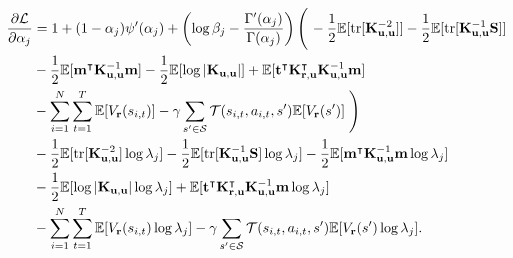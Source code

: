 \documentclass{article}
\theoremstyle{definition}
\DeclareMathOperator{\tr}{tr}
\newcommand{\Kuu}{\mathbf{K}_{\mathbf{u},\mathbf{u}}}
\newcommand{\Kru}{\mathbf{K}_{\mathbf{r},\mathbf{u}}}
\begin{document}
\[
  \begin{split}
    \frac{\partial\mathcal{L}}{\partial\alpha_j} &= 1 + (1 -
    \alpha_j)\psi'(\alpha_j) + \left( \log\beta_j -
      \frac{\Gamma'(\alpha_j)}{\Gamma(\alpha_j)} \right)
    \left(\vphantom{\sum_{i=1}^N} \right. - \frac{1}{2}
    \mathbb{E}[\tr[\Kuu^{-2}]] - \frac{1}{2}\mathbb{E}[\tr[\Kuu^{-1}\mathbf{S}]]
    \\
    &- \frac{1}{2}\mathbb{E}[\mathbf{m}^\intercal\Kuu^{-1}\mathbf{m}] -
    \frac{1}{2}\mathbb{E}[\log|\Kuu|] +
    \mathbb{E}[\mathbf{t}^\intercal\Kru^\intercal\Kuu^{-1}\mathbf{m}] \\
    &- \sum_{i=1}^N \sum_{t=1}^T \mathbb{E}[V_{\mathbf{r}}(s_{i,t})] - \gamma\sum_{s' \in
      \mathcal{S}} \mathcal{T}(s_{i,t}, a_{i,t}, s')\mathbb{E}[V_{\mathbf{r}}(s')] \left.
      \vphantom{\sum_{i=1}^N} \right) \\
    & - \frac{1}{2}\mathbb{E}[\tr[\Kuu^{-2}]\log\lambda_j] -
    \frac{1}{2}\mathbb{E}[\tr[\Kuu^{-1}\mathbf{S}]\log\lambda_j] -
    \frac{1}{2}\mathbb{E}[\mathbf{m}^\intercal\Kuu^{-1}\mathbf{m}\log\lambda_j]
    \\
    &- \frac{1}{2}\mathbb{E}[\log|\Kuu|\log\lambda_j] +
    \mathbb{E}[\mathbf{t}^\intercal\Kru^\intercal\Kuu^{-1}\mathbf{m}\log\lambda_j]
    \\
    &- \sum_{i=1}^N\sum_{t=1}^T\mathbb{E}[V_{\mathbf{r}}(s_{i,t})\log\lambda_j] -
    \gamma\sum_{s' \in \mathcal{S}}\mathcal{T}(s_{i,t}, a_{i,t},
    s')\mathbb{E}[V_{\mathbf{r}}(s')\log\lambda_j].
  \end{split}
\]
\end{document}
